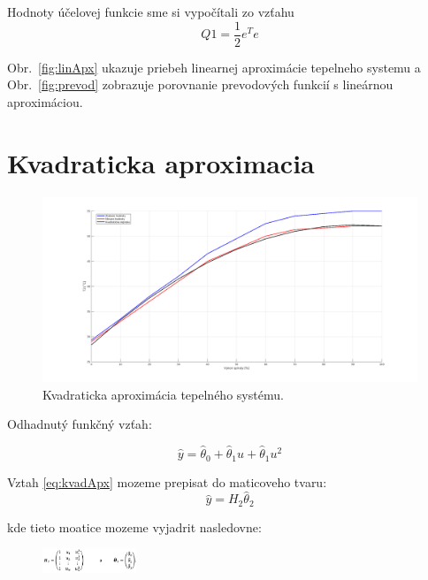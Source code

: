 \documentclass{article}
\begin{document}
Hodnoty účelovej funkcie sme si vypočítali zo vzťahu 
\begin{equation}
	Q1 = \frac{1}{2} e^Te
	\label{eq:objFunkcia}
\end{equation}

Obr.~\ref{fig:linApx} ukazuje priebeh linearnej aproximácie tepelneho systemu a
Obr.~\ref{fig:prevod} zobrazuje porovnanie prevodových funkcií s lineárnou aproximáciou.


\clearpage

\section{Kvadraticka aproximacia}
\label{sec:kvad}

\begin{figure}[!htbp]
	\begin{center}
		\includegraphics[width=\textwidth]{include/kvadraticka_regresia.png}
	\end{center}
	\caption{Kvadraticka aproximácia tepelného systému.}
	\label{fig:kvadApx}
\end{figure}

Odhadnutý funkčný vzťah:

\begin{equation}
	\hat{y} = \hat{\theta}_0 + \hat{\theta}_1u + \hat{\theta}_1u^2
	\label{eq:kvadApx}
\end{equation}

Vztah \ref{eq:kvadApx} mozeme prepisat do maticoveho tvaru:
\begin{equation}
	\hat{y} = H_2\hat{\theta}_2
	\label{eq:kvadApx2}
\end{equation}

kde tieto moatice mozeme vyjadrit nasledovne:

\begin{figure}[!htbp]
	\begin{center}
		\includegraphics[width=0.25\textwidth]{include/defHandTheta2.png}
	\end{center}
\end{figure}
\end{document}

